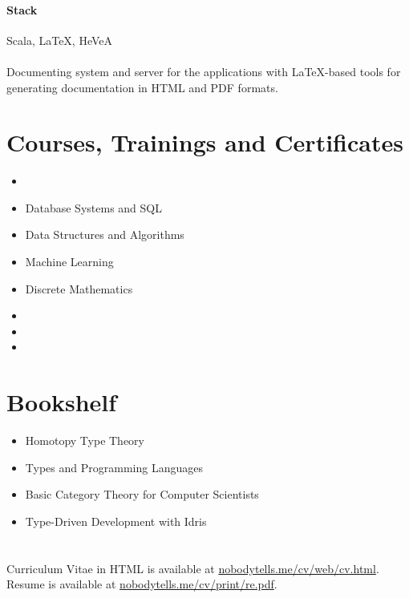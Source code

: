 \paragraph{Stack} Scala, LaTeX, HeVeA
\paragraph{}
Documenting system and server for the applications with LaTeX-based tools for generating documentation in HTML and PDF formats.

\section{Courses, Trainings and Certificates}
\begin{itemize}
  \item {}
  \item Database Systems and SQL
  \item Data Structures and Algorithms
  \item Machine Learning
  \item Discrete Mathematics
  \item {}
  \item {}
  \item {}
\end{itemize}

\section{Bookshelf}
\begin{itemize}
  \item Homotopy Type Theory
  \item Types and Programming Languages
  \item Basic Category Theory for Computer Scientists
  \item Type-Driven Development with Idris
\end{itemize}

\section*{}
Curriculum Vitae in HTML is available at \href{https://nobodytells.me/cv/web/cv.html}{nobodytells.me/cv/web/cv.html}.\\
Resume is available at \href{https://nobodytells.me/cv/print/re.pdf}{nobodytells.me/cv/print/re.pdf}.


